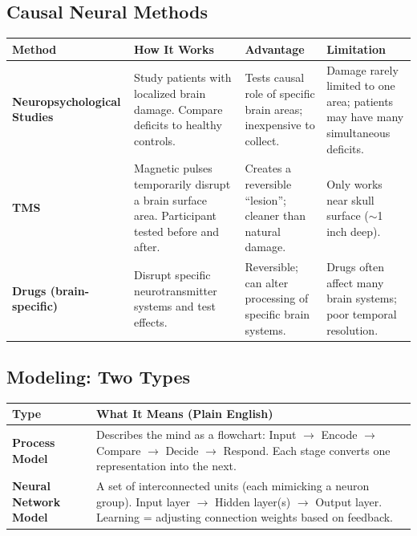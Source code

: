 \documentclass[11pt,a4paper]{article}
\newcommand{\bb}[1]{\textbf{#1}}
\begin{document}
\subsection*{Causal Neural Methods}

\begin{center}
\renewcommand{\arraystretch}{1.4}
\begin{tabular}{|L{3cm}|L{4.2cm}|L{4.2cm}|L{3.8cm}|}
\hline
{}\color{white}\bb{Method} & \color{white}\bb{How It Works} & \color{white}\bb{Advantage} & \color{white}\bb{Limitation} \\
\hline
\bb{Neuropsychological Studies} & Study patients with localized brain damage. Compare deficits to healthy controls. & Tests causal role of specific brain areas; inexpensive to collect. & Damage rarely limited to one area; patients may have many simultaneous deficits. \\
\bb{TMS} & Magnetic pulses temporarily disrupt a brain surface area. Participant tested before and after. & Creates a reversible ``lesion''; cleaner than natural damage. & Only works near skull surface ($\sim$1 inch deep). \\
\bb{Drugs (brain-specific)} & Disrupt specific neurotransmitter systems and test effects. & Reversible; can alter processing of specific brain systems. & Drugs often affect many brain systems; poor temporal resolution. \\
\hline
\end{tabular}
\end{center}

\subsection*{Modeling: Two Types}

\begin{center}
\renewcommand{\arraystretch}{1.4}
\begin{tabular}{|L{3cm}|L{12.2cm}|}
\hline
{}\color{white}\bb{Type} & \color{white}\bb{What It Means (Plain English)} \\
\hline
\bb{Process Model} & Describes the mind as a flowchart: Input $\to$ Encode $\to$ Compare $\to$ Decide $\to$ Respond. Each stage converts one representation into the next. \\
\bb{Neural Network Model} & A set of interconnected units (each mimicking a neuron group). Input layer $\to$ Hidden layer(s) $\to$ Output layer. Learning = adjusting connection weights based on feedback. \\
\hline
\end{tabular}
\end{center}
\newpage
\end{document}
